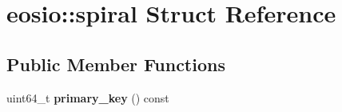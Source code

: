 \hypertarget{structeosio_1_1spiral}{}\section{eosio\+:\+:spiral Struct Reference}
\label{structeosio_1_1spiral}
\subsection*{Public Member Functions}
\begin{DoxyCompactItemize}
\item 
\mbox{\label{structeosio_1_1spiral_a21f0567aa49356e28036d8cf6c1ff79f}} 
uint64\+\_\+t {\bfseries primary\+\_\+key} () const
\end{DoxyCompactItemize}
